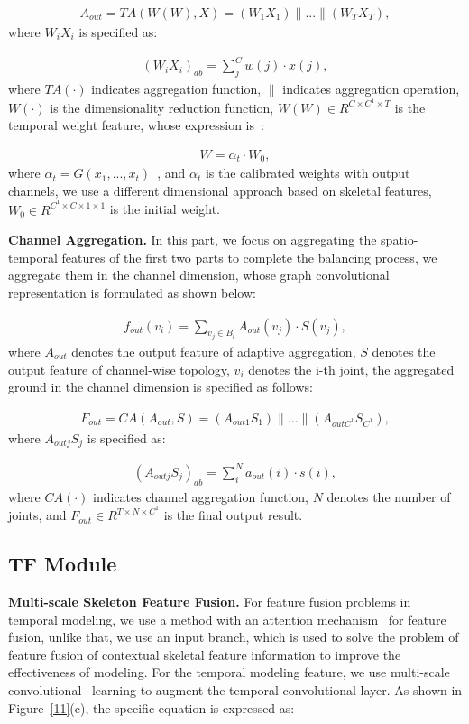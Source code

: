 \documentclass[letterpaper]{article} \usepackage[submission]{aaai23}  \usepackage{times}  \usepackage{helvet}  \usepackage{courier}  \usepackage[hyphens]{url}  \usepackage{graphicx} \urlstyle{rm} \def\UrlFont{\rm}  \usepackage{natbib}  \usepackage{caption} \frenchspacing  \setlength{\pdfpagewidth}{8.5in} \setlength{\pdfpageheight}{11in} \usepackage{algorithm}
\begin{document}
\begin{align}
A_{out}=TA(W(W),X)=(W_{1}X_{1})\parallel...\parallel(W_{T}X_{T}),
\end{align}
where $W_{i}X_{i}$ is specified as:

\begin{align}
(W_{i}X_{i})_{ab}=\sum_{j}^{C} w(j)\cdot x(j),
\end{align}
where $TA(\cdot)$ indicates aggregation function, $\parallel$ indicates aggregation operation, $W(\cdot)$ is the dimensionality reduction function, $W(W)\in R^{C\times  C^{1}\times T}$ is the temporal weight feature, whose expression is~\cite{DBLP:journals/corr/abs-2110-06178}:

\begin{align}
W=\alpha _{t}\cdot W_{0},
\end{align}
where $\alpha _{t}=G(x_{1},...,x_{t})$~\cite{DBLP:journals/corr/abs-2110-06178}, and $\alpha _{t}$ is the calibrated weights with output channels, we use a different dimensional approach based on skeletal features, $W_{0}\in R^{  C^{1}\times C\times 1\times 1}$ is the initial weight.


\noindent
{\bf Channel Aggregation.} In this part, we focus on aggregating the spatio-temporal features of the first two parts to complete the balancing process, we aggregate them in the channel dimension, whose graph convolutional representation is formulated as shown below:

\begin{align}
f_{out}(v_{i})=\sum _{v_{j}\in B_{i}}A_{out}(v_{j})\cdot S(v_{j}),
\end{align}
where $A_{out}$ denotes the output feature of adaptive aggregation, $S$ denotes the output feature of channel-wise topology, $v_{i}$ denotes the i-th joint, the aggregated ground in the channel dimension is specified as follows:

\begin{align}
F_{out}=CA(A_{out},S)=(A_{out1}S_{1})\parallel...\parallel(A_{outC^{1}}S_{C^{1}}),
\end{align}
where $A_{outj}S_{j}$ is specified as:

\begin{align}
(A_{outj}S_{j})_{ab}=\sum_{i}^{N} a_{out}(i)\cdot s(i),
\end{align}
where $CA(\cdot)$ indicates channel aggregation function, $N$ denotes the number of joints, and $F_{out} \in R^{T \times N\times C^{1}}$ is the final output result.
\subsection{TF Module}
\label{sec:C}
\noindent
{\bf Multi-scale Skeleton Feature Fusion.} For feature fusion problems in temporal modeling, we use a method with an attention mechanism~\cite{2020Attentional} for feature fusion, unlike that, we use an input branch, which is used to solve the problem of feature fusion of contextual skeletal feature information to improve the effectiveness of modeling. For the temporal modeling feature, we use multi-scale convolutional~\cite{2021Channel} learning to augment the temporal convolutional layer. As shown in Figure~\ref{11}(c), the specific equation is expressed as:
\end{document}
